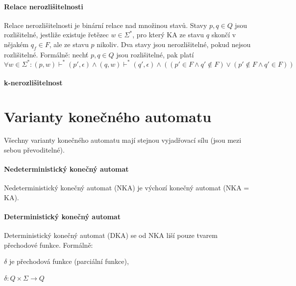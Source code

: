 \paragraph*{Relace nerozlišitelnosti} Relace nerozlišitelnosti je binární relace nad množinou stavů. Stavy $p, q \in Q$ jsou rozlišitelné, jestliže existuje řetězec $w \in \Sigma^*$, pro který KA ze stavu $q$ skončí v nějakém $q_f \in F$, ale ze stavu $p$ nikoliv. Dva stavy jsou nerozlišitelné, pokud nejsou rozlišitelné. Formálně: nechť $p, q \in Q$ jsou rozlišitelné, pak platí $$ \forall w \in \Sigma^* : (p, w) \vdash^* (p', \epsilon) \land (q, w) \vdash^* (q', \epsilon) \land ( (p' \in F \land q' \not\in F) \lor (p' \not\in F \land q' \in F) ) $$

\paragraph*{k-nerozlišitelnost} 


\section{Varianty konečného automatu}

Všechny varianty konečného automatu mají stejnou vyjadřovací sílu (jsou mezi sebou převoditelné).

\paragraph*{Nedeterministický konečný automat} Nedeterministický konečný automat (NKA) je výchozí konečný automat (NKA = KA).

\paragraph*{Deterministický konečný automat} Deterministický konečný automat (DKA) se od NKA liší pouze tvarem přechodové funkce. Formálně: \begin{compactitem}
    \item $\delta$ je přechodová funkce (parciální funkce), \begin{compactitem}
        \item $\delta : Q \times \Sigma \rightarrow Q$
    \end{compactitem}
\end{compactitem}

